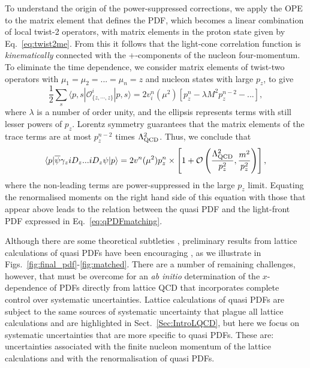 To understand the origin of the power-suppressed corrections, we apply the OPE to the matrix element that defines the PDF, which becomes a linear combination of local twist-2 operators, with matrix elements in the proton state given by Eq.~\eqref{eq:twist2me}. From this it follows that the light-cone correlation function is {\it kinematically} connected with the +-components of the nucleon four-momentum. To eliminate the time dependence, we consider matrix elements of twist-two operators with $\mu_1=\mu_2=...=\mu_n=z$ and nucleon states with large $p_z$, to give
\begin{equation}
\frac{1}{2} \sum_s \langle p,s|\mathcal{O}^i_{\{z,\cdots,z\}}|p,s\rangle = 2v_i^n(\mu^2)\left[p_z^n-\lambda M^2 p_z^{n-2}-...\right], 
\end{equation}
where $\lambda$ is a number of order unity, and the ellipsis represents terms
with still lesser powers of $p_z$. Lorentz symmetry guarantees that the matrix elements of the trace terms are at most
$p_z^{n-2}$ times $\Lambda^2_{\rm QCD}$. Thus, we conclude that
\begin{equation}
      \langle p| {\overline \psi}\gamma_ziD_z ... iD_z \psi|p\rangle
       = 2v^n(\mu^2) p_z^n\times \left[ 1 + {\cal O}\left(\frac{\Lambda^2_{\rm QCD}}{p_z^2},  \frac{m^2}{p_z^2}\right)\right],
\end{equation}
where the non-leading terms are power-suppressed in the large $p_z$ limit. Equating the renormalised moments on the right hand side of this equation with those that appear above
leads to the relation between the quasi PDF and the light-front
PDF expressed in Eq.~\eqref{eq:qPDFmatching}.

Although there are some theoretical subtleties \cite{Rossi:2017muf,Ji:2017rah}, preliminary results from lattice calculations of quasi PDFs have been encouraging \cite{Lin:2014zya,Alexandrou:2015rja,Chen:2016utp,Alexandrou:2016jqi}, as we illustrate in Figs.~\ref{fig:final_pdf}-\ref{fig:matched}. There are a number of remaining challenges, however, that must be overcome for an {\it ab initio} determination of the $x$-dependence of PDFs directly from lattice QCD that incorporates complete control over systematic uncertainties. Lattice calculations of quasi PDFs are subject to the same sources of systematic uncertainty that plague all lattice calculations and are highlighted in Sect.~\ref{Sec:IntroLQCD}, but here we focus on systematic uncertainties that are more specific to quasi PDFs. These are: uncertainties associated with the finite nucleon momentum of the lattice calculations and with the renormalisation of quasi PDFs.

